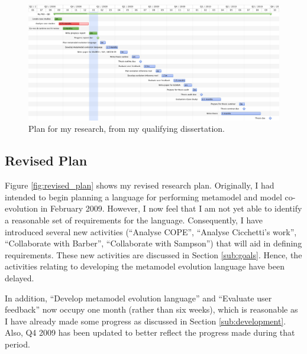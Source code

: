 \newpage
\begin{landscape}

\begin{figure}[ht]
  \begin{center}
    \leavevmode
    \includegraphics[scale=0.5]{old_plan.png}
  \end{center}
  \caption{Plan for my research, from my qualifying dissertation.}
  \label{fig:old_plan}
\end{figure}

\end{landscape}


\subsection{Revised Plan}
\label{sub:revised_plan}
Figure \ref{fig:revised_plan} shows my revised research plan. Originally, I had intended to begin planning a language for performing metamodel and model co-evolution in February 2009. However, I now feel that I am not yet able to identify a reasonable set of requirements for the language. Consequently, I have introduced several new activities (``Analyse COPE'', ``Analyse Cicchetti's work'', ``Collaborate with Barber'', ``Collaborate with Sampson'') that will aid in defining requirements. These new activities are discussed in Section \ref{sub:goals}. Hence, the activities relating to developing the metamodel evolution language have been delayed.

In addition, ``Develop metamodel evolution language'' and ``Evaluate user feedback'' now occupy one month (rather than six weeks), which is reasonable as I have already made some progress as discussed in Section \ref{sub:development}. Also, Q4 2009 has been updated to better reflect the progress made during that period.


